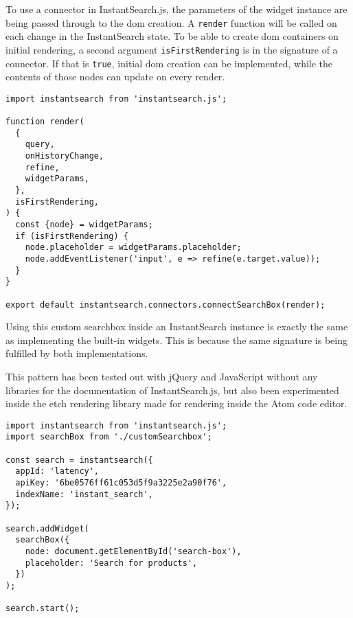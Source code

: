 To use a connector in InstantSearch.js, the parameters of the widget instance are being passed through to the \acrshort{dom} creation. A {\tt render} function will be called on each change in the InstantSearch state. To be able to create \acrshort{dom} containers on initial rendering, a second argument {\tt isFirstRendering} is in the signature of a connector. If that is {\tt true}, initial \acrshort{dom} creation can be implemented, while the contents of those nodes can update on every render.

\begin{minipage}{\linewidth}
\begin{lstlisting}[caption={Initializing a searchbox connector in InstantSearch.js},label={lst:isjs-connector-searchbox}]
import instantsearch from 'instantsearch.js';

function render(
  {
    query,
    onHistoryChange,
    refine,
    widgetParams,
  },
  isFirstRendering,
) {
  const {node} = widgetParams;
  if (isFirstRendering) {
    node.placeholder = widgetParams.placeholder;
    node.addEventListener('input', e => refine(e.target.value));
  }
}

export default instantsearch.connectors.connectSearchBox(render);
\end{lstlisting}
\end{minipage}

Using this custom searchbox inside an InstantSearch instance is exactly the same as implementing the built-in widgets. This is because the same signature is being fulfilled by both implementations.

This pattern has been tested out with jQuery and JavaScript without any libraries for the documentation of InstantSearch.js, but also been experimented inside the etch rendering \gls{library} made for rendering inside the Atom code editor.

\begin{minipage}{\linewidth}
\begin{lstlisting}[caption={Configure in an InstantSearch container},label={lst:isjs-connector-usage}]
import instantsearch from 'instantsearch.js';
import searchBox from './customSearchbox';

const search = instantsearch({
  appId: 'latency',
  apiKey: '6be0576ff61c053d5f9a3225e2a90f76',
  indexName: 'instant_search',
});

search.addWidget(
  searchBox({
    node: document.getElementById('search-box'),
    placeholder: 'Search for products',
  })
);

search.start();
\end{lstlisting}
\end{minipage}

